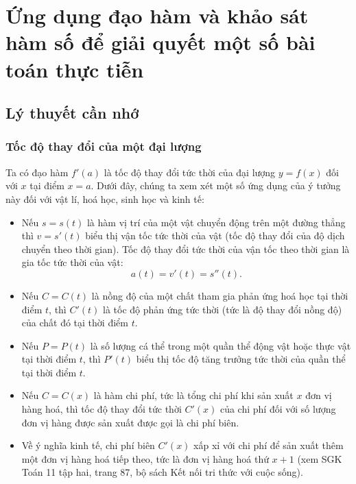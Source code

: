 \section{Ứng dụng đạo hàm và khảo sát hàm số để giải quyết một số bài toán thực tiễn}
\subsection{Lý thuyết cần nhớ}
\subsubsection{Tốc độ thay đổi của một đại lượng}
Ta có đạo hàm $f'(a)$ là tốc độ thay đổi tức thời của đại lượng $y=f(x)$ đối với $x$ tại điểm $x=a$. Dưới đây, chúng ta xem xét một số ứng dụng của ý tưởng này đối với vật lí, hoá học, sinh học và kinh tế: 
\begin{itemize}
	\item Nếu $s=s(t)$ là hàm vị trí của một vật chuyển động trên một đường thẳng thì $v=s'(t)$ biểu thị vận tốc tức thời của vật (tốc độ thay đổi của độ dịch chuyển theo thời gian). Tốc độ thay đổi tức thời của vận tốc theo thời gian là gia tốc tức thời của vật:
	$$
	a(t)=v'(t)=s''(t).
	$$
	\item Nếu $C=C(t)$ là nồng độ của một chất tham gia phản ứng hoá học tại thời điểm $t$, thì $C'(t)$ là tốc độ phản ứng tức thời (tức là độ thay đổi nồng độ) của chất đó tại thời điểm $t$.
	\item Nếu $P=P(t)$ là số lượng cá thể trong một quần thể động vật hoặc thực vật tại thời điểm $t$, thì $P'(t)$ biểu thị tốc độ tăng trưởng tức thời của quần thể tại thời điểm $t$.
	\item  Nếu $C=C(x)$ là hàm chi phí, tức là tổng chi phí khi sản xuất $x$ đơn vị hàng hoá, thì tốc độ thay đổi tức thời $C'(x)$ của chi phí đối với số lượng đơn vị hàng được sản xuất được gọi là chi phí biên.
	\item Về ý nghĩa kinh tế, chi phí biên $C'(x)$ xấp xỉ với chi phí để sản xuất thêm một đơn vị hàng hoá tiếp theo, tức là đơn vị hàng hoá thứ $x+1$ (xem SGK Toán 11 tập hai, trang 87, bộ sách Kết nối tri thức với cuộc sống). 
\end{itemize}
